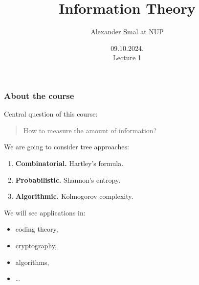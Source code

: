 \documentclass[aspectratio=169]{beamer}
\title{Information Theory}
\author{Alexander Smal at NUP}
\date{09.10.2024.\\ Lecture 1}
\begin{document}
\begin{frame}[plain]
    \maketitle
\end{frame}

\begin{frame}
    \frametitle{About the course}
    Central question of this course:\medskip

    \begin{quote}
        How to measure the amount of information?
    \end{quote}

    \medskip\pause
    We are going to consider tree approaches:
    \begin{enumerate}
        \item \textbf{Combinatorial.} Hartley's formula.
        \item \textbf{Probabilistic.} Shannon's entropy.
        \item \textbf{Algorithmic.} Kolmogorov complexity.
    \end{enumerate}
    \medskip\pause
    We will see applications in:
    \begin{itemize}
        \item coding theory,
        \item cryptography,
        \item algorithms,
        \item \ldots
    \end{itemize}
\end{frame}

\end{document}
